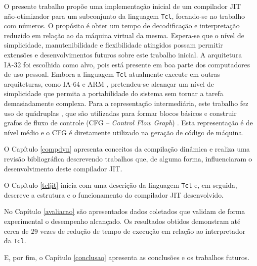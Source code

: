 O presente trabalho propõe uma implementação inicial de um compilador
JIT não-otimizador para um subconjunto da linguagem \texttt{Tcl},
focando-se no trabalho com números. O
propósito é obter um tempo de decodificação e interpretação
reduzido em relação ao da máquina virtual da mesma. Espera-se que o nível de
simplicidade, manutenibilidade e flexibilidade atingidos possam
permitir extensões e desenvolvimentos futuros sobre este trabalho inicial.
A arquitetura IA-32 \cite{intel_basicarch} foi escolhida como alvo,
pois está presente em boa
parte dos computadores de uso pessoal. Embora a linguagem \texttt{Tcl}
atualmente execute em outras arquiteturas, como IA-64
\cite{intel_basicarch} e ARM \cite{arm_arch}, pretendeu-se alcançar um
nível de simplicidade que permita a portabilidade do sistema sem
tornar a tarefa demasiadamente complexa. Para a representação
intermediária, este trabalho fez uso de
quádruplas \cite{muchnick}, que são utilizadas para formar
blocos básicos e
construir grafos de fluxo de controle (CFG -- \textit{Control Flow
  Graph}) .
Esta representação é de nível médio e
o CFG é diretamente utilizado na geração de código de máquina.

O Capítulo \ref{compdyn} apresenta conceitos da compilação dinâmica e
realiza uma revisão bibliográfica descrevendo trabalhos que, de alguma
forma, influenciaram o desenvolvimento deste compilador JIT.

O Capítulo \ref{tcljit} inicia com uma descrição da linguagem
\texttt{Tcl} e, em seguida, descreve a estrutura e o funcionamento do
compilador JIT desenvolvido.

No Capítulo \ref{avaliacao} são apresentados dados coletados que
validam de forma experimental o desempenho alcançado. Os resultados
obtidos demonstram até cerca de 29 vezes de redução de tempo de
execução em relação ao interpretador da \texttt{Tcl}.

E, por fim, o Capítulo \ref{conclusao} apresenta as conclusões e os
trabalhos futuros.
